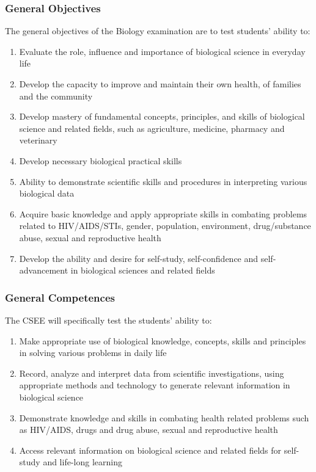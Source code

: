 \subsubsection{General Objectives}
\noindent The general objectives of the Biology examination are to test students' ability to:
\begin{enumerate}[topsep=1ex,itemsep=0ex,partopsep=1ex,parsep=1ex]
	\item Evaluate the role, influence and importance of biological science in everyday life
	\item Develop the capacity to improve and maintain their own health, of families and the community
	\item Develop mastery of fundamental concepts, principles, and skills of biological science and related fields, such as agriculture, medicine, pharmacy and veterinary
	\item Develop necessary biological practical skills
	\item Ability to demonstrate scientific skills and procedures in interpreting various biological data
	\item Acquire basic knowledge and apply appropriate skills in combating problems related to HIV/AIDS/STIs, gender, population, environment, drug/substance abuse, sexual and reproductive health
	\item Develop the ability and desire for self-study, self-confidence and self-advancement in biological sciences and related fields
\end{enumerate}

\subsubsection{General Competences}
\noindent The CSEE will specifically test the students' ability to:
\begin{enumerate}[topsep=1ex,itemsep=0ex,partopsep=1ex,parsep=1ex]
	\item Make appropriate use of biological knowledge, concepts, skills and principles in solving various problems in daily life
	\item Record, analyze and interpret data from scientific investigations, using appropriate methods and technology to generate relevant information in biological science
	\item Demonstrate knowledge and skills in combating health related problems such as HIV/AIDS, drugs and drug abuse, sexual and reproductive health
	\item Access relevant information on biological science and related fields for self-study and life-long learning
\end{enumerate}

